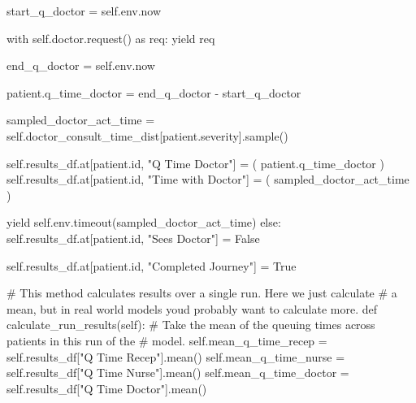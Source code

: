 \documentclass[
  letterpaper,
  DIV=11,
  numbers=noendperiod]{scrreprt}
\newenvironment{Shaded}{}{}
\newcommand{\BuiltInTok}[1]{\textcolor[rgb]{0.84,0.23,0.29}{#1}}
\newcommand{\CommentTok}[1]{\textcolor[rgb]{0.42,0.45,0.49}{#1}}
\newcommand{\ControlFlowTok}[1]{\textcolor[rgb]{0.84,0.23,0.29}{#1}}
\newcommand{\ImportTok}[1]{\textcolor[rgb]{0.01,0.18,0.38}{#1}}
\newcommand{\KeywordTok}[1]{\textcolor[rgb]{0.84,0.23,0.29}{#1}}
\newcommand{\NormalTok}[1]{\textcolor[rgb]{0.14,0.16,0.18}{#1}}
\newcommand{\OperatorTok}[1]{\textcolor[rgb]{0.14,0.16,0.18}{#1}}
\newcommand{\StringTok}[1]{\textcolor[rgb]{0.01,0.18,0.38}{#1}}
\newcommand{\VariableTok}[1]{\textcolor[rgb]{0.89,0.38,0.04}{#1}}
\newcommand*\circled[1]{\tikz[baseline=(char.base)]{
          \node[shape=circle,draw,inner sep=1pt] (char) {{\scriptsize#1}};}}
\begin{document}
\begin{tcolorbox}
\begin{Shaded}
\begin{Highlighting}[]
\NormalTok{            start\_q\_doctor }\OperatorTok{=} \VariableTok{self}\NormalTok{.env.now}

            \ControlFlowTok{with} \VariableTok{self}\NormalTok{.doctor.request() }\ImportTok{as}\NormalTok{ req:}
                \ControlFlowTok{yield}\NormalTok{ req}

\NormalTok{                end\_q\_doctor }\OperatorTok{=} \VariableTok{self}\NormalTok{.env.now}

\NormalTok{                patient.q\_time\_doctor }\OperatorTok{=}\NormalTok{ end\_q\_doctor }\OperatorTok{{-}}\NormalTok{ start\_q\_doctor}

\NormalTok{                sampled\_doctor\_act\_time }\OperatorTok{=} \VariableTok{self}\NormalTok{.doctor\_consult\_time\_dist[patient.severity].sample() }\hspace*{\fill}\NormalTok{\circled{2}}

                \VariableTok{self}\NormalTok{.results\_df.at[patient.}\BuiltInTok{id}\NormalTok{, }\StringTok{"Q Time Doctor"}\NormalTok{] }\OperatorTok{=}\NormalTok{ (}
\NormalTok{                    patient.q\_time\_doctor}
\NormalTok{                )}
                \VariableTok{self}\NormalTok{.results\_df.at[patient.}\BuiltInTok{id}\NormalTok{, }\StringTok{"Time with Doctor"}\NormalTok{] }\OperatorTok{=}\NormalTok{ (}
\NormalTok{                    sampled\_doctor\_act\_time}
\NormalTok{                )}

                \ControlFlowTok{yield} \VariableTok{self}\NormalTok{.env.timeout(sampled\_doctor\_act\_time)}
        \ControlFlowTok{else}\NormalTok{:}
            \VariableTok{self}\NormalTok{.results\_df.at[patient.}\BuiltInTok{id}\NormalTok{, }\StringTok{"Sees Doctor"}\NormalTok{] }\OperatorTok{=} \VariableTok{False}

        \VariableTok{self}\NormalTok{.results\_df.at[patient.}\BuiltInTok{id}\NormalTok{, }\StringTok{"Completed Journey"}\NormalTok{] }\OperatorTok{=} \VariableTok{True}

    \CommentTok{\# This method calculates results over a single run.  Here we just calculate}
    \CommentTok{\# a mean, but in real world models you\textquotesingle{}d probably want to calculate more.}
    \KeywordTok{def}\NormalTok{ calculate\_run\_results(}\VariableTok{self}\NormalTok{):}
        \CommentTok{\# Take the mean of the queuing times across patients in this run of the}
        \CommentTok{\# model.}
        \VariableTok{self}\NormalTok{.mean\_q\_time\_recep }\OperatorTok{=} \VariableTok{self}\NormalTok{.results\_df[}\StringTok{"Q Time Recep"}\NormalTok{].mean()}
        \VariableTok{self}\NormalTok{.mean\_q\_time\_nurse }\OperatorTok{=} \VariableTok{self}\NormalTok{.results\_df[}\StringTok{"Q Time Nurse"}\NormalTok{].mean()}
        \VariableTok{self}\NormalTok{.mean\_q\_time\_doctor }\OperatorTok{=} \VariableTok{self}\NormalTok{.results\_df[}\StringTok{"Q Time Doctor"}\NormalTok{].mean()}


\end{Highlighting}
\end{Shaded}
\end{tcolorbox}
\end{document}
